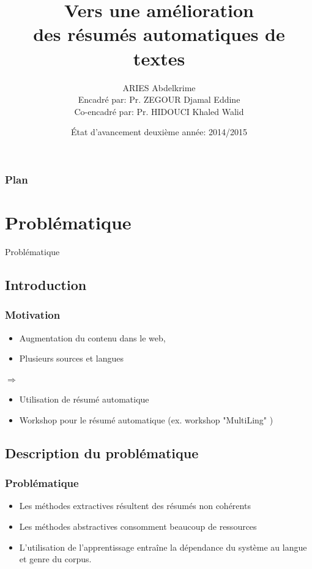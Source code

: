 \documentclass{beamer}
\title[Vers une amélioration \\des résumés automatiques de textes \hspace*{2cm}  \textbf{\footnotesize  \insertframenumber/\inserttotalframenumber} ] %
{Vers une amélioration \\des résumés automatiques de textes} %
\institute{ %
École  nationale Supérieure d'Informatique (ESI, ex. INI), Algérie  %
}
\author[ARIES Abdelkrime (ESI 2014)] %
{ARIES Abdelkrime \\ {\footnotesize %
Encadré par: Pr. ZEGOUR Djamal Eddine\\%
Co-encadré par: Pr. HIDOUCI Khaled Walid}}
\date{État d'avancement deuxième année: 2014/2015} %
\begin{document}

\begin{frame}[plain]
\maketitle
\end{frame}


\begin{frame}
\frametitle{Plan}
{\footnotesize \tableofcontents[hideothersubsections]}
\end{frame}

\section{Problématique}
\begin{frame}
\begin{center}
{\Huge Problématique}
\end{center}
\end{frame}

\subsection{Introduction}

\begin{frame}
\frametitle{Motivation}

\begin{itemize}
\item Augmentation du contenu dans le web,
\item Plusieurs sources et langues 
\end{itemize}
$ \Rightarrow $
\begin{itemize}
\item Utilisation de résumé automatique
\item Workshop pour le résumé automatique (ex. workshop "MultiLing" )
\end{itemize}

\end{frame}

\subsection{Description du problématique}

\begin{frame}
\frametitle{Problématique}

\begin{itemize}
\item Les méthodes extractives résultent des résumés non cohérents
\item Les méthodes abstractives consomment beaucoup de ressources
\item L'utilisation de l'apprentissage entraîne la dépendance du système au langue et genre du corpus.
\end{itemize}

\end{frame}
\end{document}
